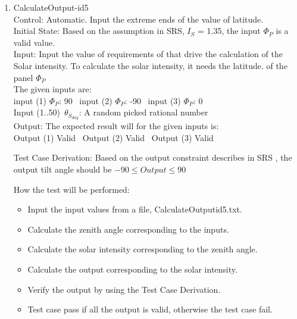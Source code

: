 \documentclass[12pt, titlepage]{article}
\begin{document}
\begin{enumerate}
 

\item{CalculateOutput-id5\\}
Control: Automatic. Input the extreme ends of the value of latitude.\\

Initial State: Based on the assumption in SRS\cite{YS2019}, $I_{S}$ = 1.35, the input 
$\Phi_P$ is a valid value.\\

Input: Input the value of requirements of \progname that drive the calculation
of the Solar intensity. To calculate the solar intensity, it needs the latitude. of the panel $\Phi_P$\\

The given inputs are:\\ 

input (1) $\Phi_P$: 90 
~input (2) $\Phi_P$: -90 
~input (3) $\Phi_P$: 0\\

Input (1..50)~$\theta_{S_{day}}$: A random  picked rational number \\




Output: The expected result will for the given inputs is:\\ 
Output (1) Valid
~Output (2) Valid
~Output (3) Valid \\




Test Case Derivation: Based on the output  constraint describes in SRS \cite{YS2019}, the 
output tilt angle should be $-90 \leq Output \leq 90$

How the test will be performed:
\begin{itemize}
\item Input the input values from a file, CalculateOutputid5.txt.
\item Calculate the zenith angle corresponding to the inputs.
\item Calculate the solar intensity corresponding to the zenith angle.
\item Calculate the output corresponding to the solar intensity.
\item Verify the output by using the Test Case Derivation.
\item Test case pass if all the output is valid,
otherwise the test case fail.
\end{itemize}
\end{enumerate}
\end{document}
